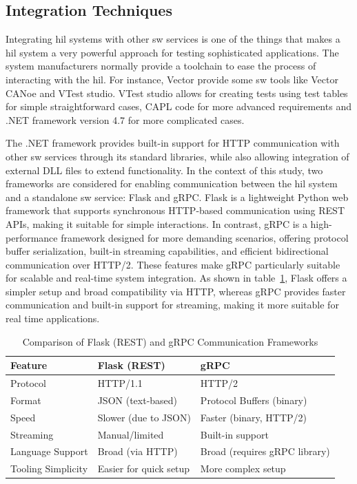 \subsection{Integration Techniques}
Integrating \gls{hil} systems with other \gls{sw} services is one of the things that makes a \gls{hil} system a very powerful approach for testing sophisticated applications. The system manufacturers normally provide a toolchain to ease the process of interacting with the \gls{hil}. For instance, Vector provide some \gls{sw} tools like Vector CANoe and VTest studio. VTest studio allows for creating tests using test tables for simple straightforward cases, CAPL code for more advanced requirements and .NET framework version 4.7 for more complicated cases. 

The .NET framework provides built-in support for HTTP communication with other \gls{sw} services through its standard libraries, while also allowing integration of external DLL files to extend functionality. In the context of this study, two frameworks are considered for enabling communication between the \gls{hil} system and a standalone \gls{sw} service: Flask and gRPC. Flask is a lightweight Python web framework that supports synchronous HTTP-based communication using REST APIs, making it suitable for simple interactions. In contrast, gRPC is a high-performance framework designed for more demanding scenarios, offering protocol buffer serialization, built-in streaming capabilities, and efficient bidirectional communication over HTTP/2. These features make gRPC particularly suitable for scalable and real-time system integration. As shown in table~\ref{tab:flask_grpc_comparison}, Flask offers a simpler setup and broad compatibility via HTTP, whereas gRPC provides faster communication and built-in support for streaming, making it more suitable for real time applications.

\begin{table}[h!]
    \centering
    \caption{Comparison of Flask (REST) and gRPC Communication Frameworks}
    \label{tab:flask_grpc_comparison}
    \begin{tabularx}{\textwidth}{|l|X|X|}
    \hline
    \textbf{Feature} & \textbf{Flask (REST)} & \textbf{gRPC} \\
    \hline
    Protocol & HTTP/1.1 & HTTP/2 \\
    \hline
    Format & JSON (text-based) & Protocol Buffers (binary) \\
    \hline
    Speed & Slower (due to JSON) & Faster (binary, HTTP/2) \\
    \hline
    Streaming & Manual/limited & Built-in support \\
    \hline
    Language Support & Broad (via HTTP) & Broad (requires gRPC library) \\
    \hline
    Tooling Simplicity & Easier for quick setup & More complex setup \\
    \hline
    \end{tabularx}
    \end{table}

